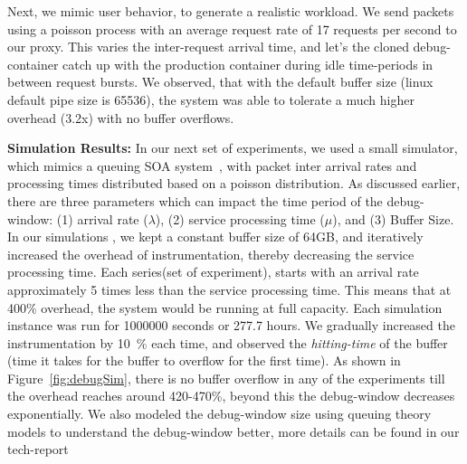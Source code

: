 Next, we mimic user behavior, to generate a realistic workload.
We send packets using a poisson process with an average request rate of 17 requests per second to our proxy. 
This varies the inter-request arrival time, and let's the cloned debug-container catch up with the production container during idle time-periods in between request bursts.
We observed, that with the default buffer size (linux default pipe size is 65536), the system was able to tolerate a much higher overhead (3.2x) with no buffer overflows.

\noindent
\textbf{Simulation Results:} In our next set of experiments, we used a small simulator, which mimics a queuing SOA system~\cite{kendall,queueSystem}, with packet inter arrival rates and processing times distributed based on a poisson distribution.
As discussed earlier, there are three parameters which can impact the time period of the debug-window: (1) arrival rate ($\lambda$), (2) service processing time ($\mu$), and (3) Buffer Size.
In our simulations , we kept a constant buffer size of 64GB, and iteratively increased the overhead of instrumentation, thereby decreasing the service processing time.
Each series(set of experiment), starts with an arrival rate approximately 5 times less than the service processing time. 
This means that at 400\% overhead, the system would be running at full capacity.
Each simulation instance was run for 1000000 seconds or 277.7 hours.
We gradually increased the instrumentation by 10~\% each time, and observed the \textit{hitting-time} of the buffer (time it takes for the buffer to overflow for the first time).
As shown in Figure~\ref{fig:debugSim}, there is no buffer overflow in any of the experiments till the overhead reaches around 420-470\%, beyond this the debug-window decreases exponentially.
We also modeled the debug-window size using queuing theory models to understand the debug-window better, more details can be found in our tech-report~\cite{queue}


\noindent{}


